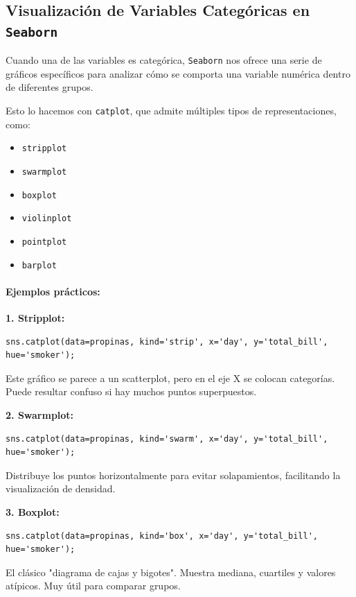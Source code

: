 \documentclass{article}
\theoremstyle{nonumberplain}
\begin{document}
\vspace{1em}
\subsection*{Visualización de Variables Categóricas en \texttt{Seaborn}}

Cuando una de las variables es categórica, \texttt{Seaborn} nos ofrece una serie de gráficos específicos para analizar cómo se comporta una variable numérica dentro de diferentes grupos.

Esto lo hacemos con \texttt{catplot}, que admite múltiples tipos de representaciones, como:

\begin{itemize}
    \item \texttt{stripplot}
    \item \texttt{swarmplot}
    \item \texttt{boxplot}
    \item \texttt{violinplot}
    \item \texttt{pointplot}
    \item \texttt{barplot}
\end{itemize}

\paragraph{Ejemplos prácticos:}

\textbf{1. Stripplot:}
\begin{verbatim}
sns.catplot(data=propinas, kind='strip', x='day', y='total_bill', hue='smoker');
\end{verbatim}

Este gráfico se parece a un scatterplot, pero en el eje X se colocan categorías. Puede resultar confuso si hay muchos puntos superpuestos.

\textbf{2. Swarmplot:}
\begin{verbatim}
sns.catplot(data=propinas, kind='swarm', x='day', y='total_bill', hue='smoker');
\end{verbatim}

Distribuye los puntos horizontalmente para evitar solapamientos, facilitando la visualización de densidad.

\textbf{3. Boxplot:}
\begin{verbatim}
sns.catplot(data=propinas, kind='box', x='day', y='total_bill', hue='smoker');
\end{verbatim}

El clásico "diagrama de cajas y bigotes". Muestra mediana, cuartiles y valores atípicos. Muy útil para comparar grupos.
\end{document}
